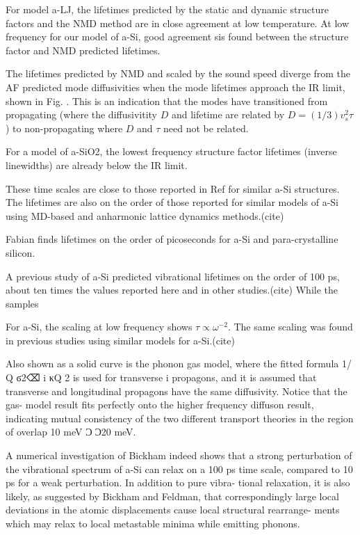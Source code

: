 \documentclass[aps,prb,twocolumn,superscriptaddress,footinbib,amsmath,amssymb,floatfix]{revtex4}
\begin{document}
For model a-LJ, the lifetimes predicted by the static and dynamic 
structure factors and the NMD method are in close agreement 
at low temperature.\cite{mazzacurati_low-frequency_1996} 
At low frequency for our model of a-Si, good 
agreement sis found between the structure factor and NMD predicted 
lifetimes.

The lifetimes predicted by NMD and scaled by the sound speed 
diverge from the AF predicted mode diffusivities when the mode 
lifetimes approach the IR limit, shown in 
Fig. . This is an indication that the modes have transitioned 
from propagating (where the diffusivitity $D$ and lifetime are 
related by $D = (1/3)v^2_s\tau$) to non-propagating where 
$D$ and $\tau$ need not be related.
\cite{allen_thermal_1993,feldman_thermal_1993,feldman_numerical_1999,
allen_evolution_1998}


For a model of a-SiO2, the lowest frequency structure factor 
lifetimes (inverse linewidths) are already below the IR limit.
\cite{taraskin_phonons_1997}

These time scales are close to those reported in Ref for similar 
a-Si structures. The lifetimes are also on the order of those
reported for similar models of a-Si using MD-based and anharmonic 
lattice dynamics methods.(cite) 

Fabian finds lifetimes on the order of picoseconds for a-Si and 
para-crystalline silicon.
\cite{fabian_anharmonic_1996,fabian_numerical_2003}

A previous study of a-Si predicted vibrational lifetimes on the 
order of 100 ps, about ten times the values reported here and in 
other studies.(cite) While the samples 

For a-Si, the scaling at low frequency shows 
$\tau \propto \omega^{-2}$.  The same scaling was found in previous 
studies using similar models for a-Si.(cite) 

Also
shown as a solid curve is the phonon gas model, where the
fitted formula 1/␶ Q ϭ2⌫ i κQ 2
is used for transverse
i
propagons, and it is assumed that transverse and longitudinal
propagons have the same diffusivity. Notice that the gas-
model result fits perfectly onto the higher frequency diffuson
result, indicating mutual consistency of the two different
transport theories in the region of overlap 10 meV Ͻ␻Ͻ20
meV.

A numerical investigation of Bickham\cite{bickham_numerical_1999} 
indeed shows that a strong perturbation of the vibrational
spectrum of a-Si can relax on a 100 ps time scale, compared
to 10 ps for a weak perturbation. In addition to pure vibra-
tional relaxation, it is also likely, as suggested by Bickham
and Feldman,\cite{bickham_calculation_1998} 
that correspondingly large local deviations in
the atomic displacements cause local structural rearrange-
ments which may relax to local metastable minima while
emitting phonons.
\end{document}
